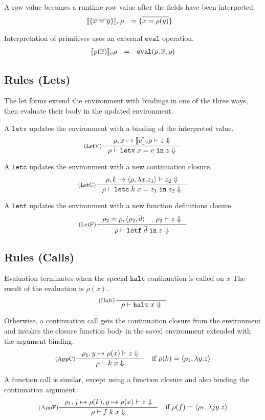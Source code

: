 \documentclass[11pt]{article}
\newcommand{\kw}[1]{\mathtt{#1}}
\begin{document}
A row value becomes a runtime row value after the fields have been interpreted.
\[
\begin{array}{rlll}
\cmp{v}{\recv{x}{y}}{\rho} & = \recv{x}{\rho(y)} &
\end{array}
\]

Interpretation of primitives uses an external $\kw{eval}$ operation.
\[
\begin{array}{rlll}
\cmp{v}{\prmv{p}{\repo{x}}}{\rho} & = & \kw{eval}(p, \repo{x}, \rho)
\end{array}
\]

\subsection*{Rules (Lets)}

The let forms extend the environment with bindings in one of the three ways, then evaluate their body in the updated environment.

A $\kw{letv}$ updates the environment with a binding of the interpreted value.
\[
\inference[(LetV)]
{\interp{\extv{\rho}{x}{\cmp{v}{v}{\rho}}}{z}}
{\interp{\rho}{\letv{x}{v}{z}}}
\]

A $\kw{letc}$ updates the environment with a new continuation closure.
\[
\inference[(LetC)]
{\interp{\extc{\rho}{k}{\rho}{x}{z_1}}{z_2}}
{\interp{\rho}{\letc{k}{x}{z_1}{z_2}}}
\]

A $\kw{letf}$ updates the environment with a new function definitions closure.
\[
\inference[(LetF)]
{\rho_2 = \extff{\rho}{\rho_2}{d} & \interp{\rho_2}{z}}
{\interp{\rho}{\letf{d}{z}}}
\]

\subsection*{Rules (Calls)}

Evaluation terminates when the special $\kw{halt}$ continuation is called on $x$
The result of the evaluation is $\rho(x)$.
\[
\inference[(Halt)]
{}
{\interp{\rho}{\appc{\kw{halt}}{x}}}
\]

Otherwise, a continuation call gets the continuation closure from the environment and invokes the closure function body in the saved environment extended with the argument binding.
\[
\begin{array}{cl}
\inference[(AppC)]
{\interp{\extv{\rho_1}{y}{\rho(x)}}{z}}
{\interp{\rho}{\appc{k}{x}}}
&
\text{if $\rho(k) = \clsc{\rho_1}{y}{z}$}
\end{array}
\]

A function call is similar, except using a function closure and also binding the continuation argument.
\[
\begin{array}{cl}
\inference[(AppF)]
{\interp{\extv{\extv{\rho_1}{j}{\rho(k)}}{y}{\rho(x)}}{z}}
{\interp{\rho}{\appf{f}{k}{x}}}
&
\text{if $\rho(f) = \clsf{\rho_1}{j}{y}{z}$}
\end{array}
\]
\end{document}

